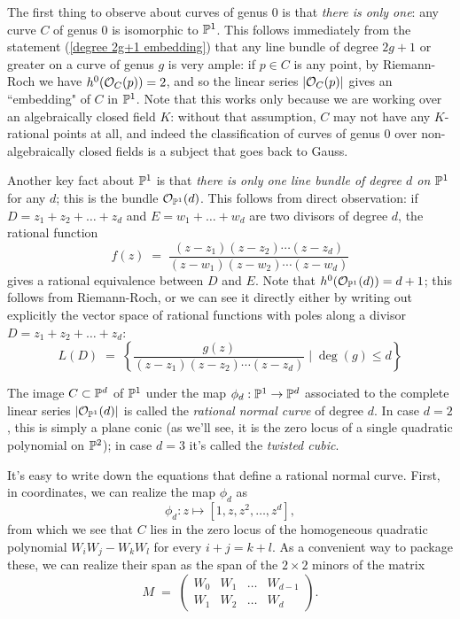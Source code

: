 The first thing to observe about curves of genus 0 is that \emph{there is only one}: any curve $C$ of genus 0 is isomorphic to $\PP^1$. This follows immediately from the statement (\ref{degree 2g+1 embedding}) that any line bundle of degree $2g+1$ or greater on a curve of genus $g$ is very ample: if $p \in C$ is any point, by Riemann-Roch we have $h^0(\cO_C(p)) = 2$, and so the linear series $|\cO_C(p)|$ gives an ``embedding" of $C$ in $\PP^1$. Note that this works only because we are working over an algebraically closed field $K$: without that assumption, $C$ may not have any $K$-rational points at all, and indeed the classification of curves of genus 0 over non-algebraically closed fields is a subject that goes back to Gauss.

Another key fact about $\PP^1$ is that \emph{there is only one line bundle of degree $d$ on $\PP^1$} for any $d$; this is the bundle $\cO_{\PP^1}(d)$. This follows from direct observation: if $D = z_1+z_2+\dots+z_d$ and $E = w_1+\dots+w_d$ are two divisors of degree $d$, the rational function
$$
f(z) \; = \; \frac{(z-z_1)(z-z_2)\cdots(z-z_d)}{(z-w_1)(z-w_2)\cdots(z-w_d)}
$$
gives a rational equivalence between $D$ and $E$. Note that $h^0(\cO_{\PP^1}(d)) = d+1$; this follows from Riemann-Roch, or we can see it directly either by writing out explicitly the vector space of rational functions with poles along a divisor $D = z_1+z_2+\dots+z_d$:
$$
L(D) \; = \; \left\{ \frac{g(z)}{(z-z_1)(z-z_2)\cdots(z-z_d)} \mid \deg(g) \leq d \right\}
$$

The image $C \subset \PP^d$ of $\PP^1$ under the map $\phi_d : \PP^1 \to \PP^d$ associated to the complete linear series $|\cO_{\PP^1}(d)|$ is called the \emph{rational normal curve} of degree $d$. In case $d=2$, this is simply a plane conic (as we'll see, it is the zero locus of a single quadratic polynomial on $\PP^2$); in case $d=3$ it's called the \emph{twisted cubic}.

It's easy to write down the equations that define a rational normal curve. First, in coordinates, we can realize the map $\phi_d$ as
$$
\phi_d : z \mapsto [1, z, z^2,\dots,z^d],
$$
from which we see that $C$ lies in the zero locus of the homogeneous quadratic polynomial $W_iW_j - W_kW_l$ for every $i+j=k+l$. As a convenient way to package these, we can realize their span as the span of the $2\times 2$ minors of the matrix
$$
M \; = \; \begin{pmatrix}
W_0 & W_1 & \dots & W_{d-1} \\
W_1 & W_2 & \dots & W_d
\end{pmatrix}.
$$

